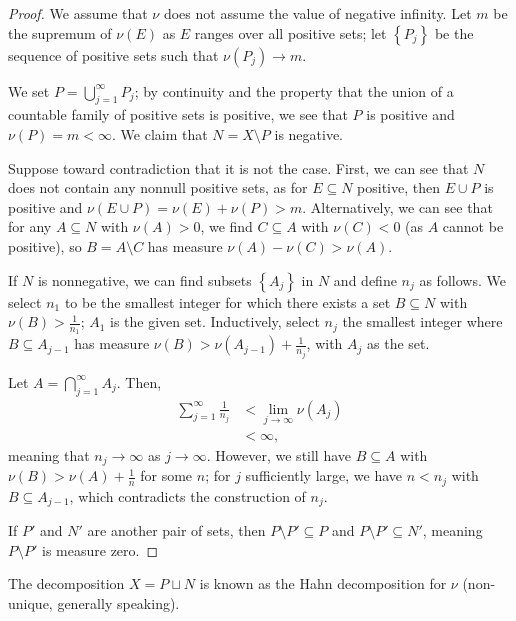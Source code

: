 \documentclass[12pt]{extarticle}
\newcommand{\set}[1]{\left\{#1\right\}}
\theoremstyle{plain}
\theoremstyle{definition}
\theoremstyle{note}
\renewcommand{\newline}{\hfill\break}
\begin{document}
\begin{proof}
  We assume that $\nu$ does not assume the value of negative infinity. Let $m$ be the supremum of $\nu(E)$ as $E$ ranges over all positive sets; let $\set{P_j}$ be the sequence of positive sets such that $\nu(P_j) \rightarrow m$.\newline

  We set $P = \bigcup_{j=1}^{\infty}P_j$; by continuity and the property that the union of a countable family of positive sets is positive, we see that $P$ is positive and $\nu(P) = m < \infty$. We claim that $N = X\setminus P$ is negative.\newline

  Suppose toward contradiction that it is not the case. First, we can see that $N$ does not contain any nonnull positive sets, as for $E\subseteq N$ positive, then $E\cup P$ is positive and $\nu(E\cup P) = \nu(E) + \nu(P) > m$. Alternatively, we can see that for any $A\subseteq N$ with $\nu(A) > 0$, we find $C\subseteq A$ with $\nu(C) < 0$ (as $A$ cannot be positive), so $B = A\setminus C$ has measure $\nu(A) - \nu(C) > \nu(A)$.\newline

  If $N$ is nonnegative, we can find subsets $\set{A_j}$ in $N$ and define $n_j$ as follows. We select $n_1$ to be the smallest integer for which there exists a set $B\subseteq N$ with $\nu(B) > \frac{1}{n_1}$; $A_1$ is the given set. Inductively, select $n_j$ the smallest integer where $B\subseteq A_{j-1}$ has measure $\nu(B) > \nu(A_{j-1}) + \frac{1}{n_j}$, with $A_j$ as the set.\newline

  Let $A = \bigcap_{j=1}^{\infty}A_j$. Then,
  \begin{align*}
    \sum_{j=1}^{\infty}\frac{1}{n_j} &< \lim_{j\rightarrow\infty}\nu\left(A_j\right)\\
                                     &<\infty,
  \end{align*}
  meaning that $n_j \rightarrow\infty$ as $j\rightarrow\infty$. However, we still have $B\subseteq A$ with $\nu(B) > \nu(A) + \frac{1}{n}$ for some $n$; for $j$ sufficiently large, we have $n < n_j$ with $B\subseteq A_{j-1}$, which contradicts the construction of $n_j$.\newline

  If $P'$ and $N'$ are another pair of sets, then $P\setminus P' \subseteq P$ and $P\setminus P' \subseteq N'$, meaning $P\setminus P'$ is measure zero.
\end{proof}
The decomposition $X = P\sqcup N$ is known as the Hahn decomposition for $\nu$ (non-unique, generally speaking).\newline
\end{document}
